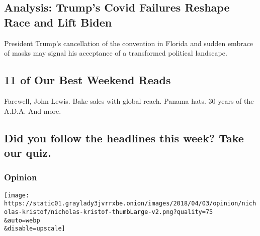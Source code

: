 \hypertarget{analysis-trumps-covid-failures-reshape-race-and-lift-biden}{%
\subsection{Analysis: Trump's Covid Failures Reshape Race and Lift
Biden}\label{analysis-trumps-covid-failures-reshape-race-and-lift-biden}}

\href{/2020/07/25/us/politics/trump-florida-convention.html}{}

President Trump's cancellation of the convention in Florida and sudden
embrace of masks may signal his acceptance of a transformed political
landscape.

\href{/2020/07/24/briefing/best-weekend-reads.html}{}

\hypertarget{11-of-our-best-weekend-reads}{%
\subsection{11 of Our Best Weekend
Reads}\label{11-of-our-best-weekend-reads}}

Farewell, John Lewis. Bake sales with global reach. Panama hats. 30
years of the A.D.A. And more.

\href{/interactive/2020/07/24/briefing/federal-agents-john-lewis-mars-news-quiz.html}{}

\hypertarget{did-you-follow-the-headlines-this-week-take-our-quiz}{%
\subsection{Did you follow the headlines this week? Take our
quiz.}\label{did-you-follow-the-headlines-this-week-take-our-quiz}}

\href{/2020/07/24/briefing/best-weekend-reads.html}{}

\href{https://www.nytimes3xbfgragh.onion/section/opinion?pagetype=Homepage\&action=click\&module=Opinion}{}

\hypertarget{opinion}{%
\subsubsection{Opinion}\label{opinion}}

\href{/2020/07/25/opinion/sunday/portland-protest-federal-troops.html}{}

\texttt{[image: https://static01.graylady3jvrrxbe.onion/images/2018/04/03/opinion/nicholas-kristof/nicholas-kristof-thumbLarge-v2.png?quality=75\\\&auto=webp\\\&disable=upscale]}

